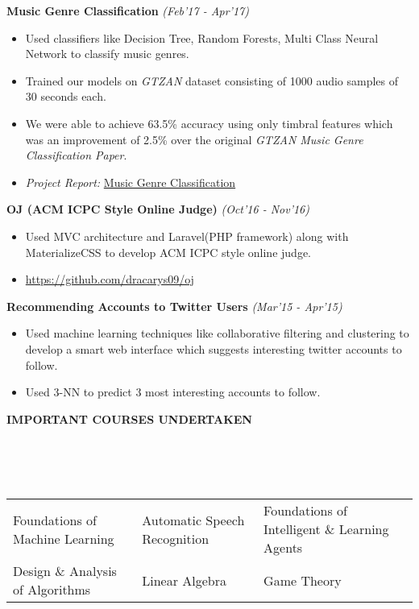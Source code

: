 \documentclass[a4paper,10pt]{article}
\newcommand{\lsep}{-0.5cm}
\newcommand{\resheading}[1]{{\small \colorbox{mygrey}{\begin{minipage}{0.975\textwidth}{\textbf{#1 \vphantom{p\^{E}}}}\end{minipage} \hspace{0.2cm}}}}
\begin{document}
\indent\small{\textbf{Music Genre Classification}}	\hfill	\small{\textit{(Feb'17 - Apr'17)}}
\begin{itemize}
 \item Used classifiers like Decision Tree, Random Forests, Multi Class Neural Network to classify music genres.
 \item Trained our models on \textit{GTZAN} dataset consisting of 1000 audio samples of 30 seconds each.
 \item We were able to achieve 63.5\% accuracy using only timbral features which was an improvement of 2.5\% over the original \textit{GTZAN Music Genre Classification Paper}.
 \item \textit{Project Report: } \href{https://goo.gl/dTFD85}{Music Genre Classification}
\newline
\newline
\end{itemize}


\indent\small{\textbf{OJ (ACM ICPC Style Online Judge)}}	\hfill	\small{\textit{(Oct'16 - Nov'16)}}
\begin{itemize}
 \item Used MVC architecture and Laravel(PHP framework) along with MaterializeCSS to develop ACM ICPC style online judge.
 \item \href{https://github.com/dracarys09/oj}{https://github.com/dracarys09/oj}
\end{itemize}

\indent\small{\textbf{Recommending Accounts to Twitter Users}}	\hfill	\small{\textit{(Mar'15 - Apr'15)}}
\begin{itemize}
 \item Used machine learning techniques like collaborative filtering and clustering to develop a smart web interface which suggests interesting twitter accounts to follow.
 \item Used 3-NN to predict 3 most interesting accounts to follow.
\end{itemize}


\resheading{\textbf{IMPORTANT COURSES UNDERTAKEN}}\\[\lsep]
\\ \\
\indent \begin{tabular*}{\textwidth}{@{\extracolsep{\fill}}lll}
Foundations of Machine Learning		&	Automatic Speech Recognition	&	Foundations of Intelligent \& Learning Agents \\
Design \& Analysis of Algorithms	&	Linear Algebra			&	Game Theory
\end{tabular*}
\end{document}
